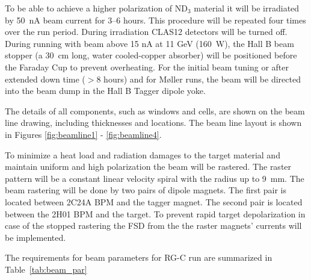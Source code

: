 \documentclass[12pt]{article}
\begin{document}
To be able to achieve a higher polarization of ND$_3$ material it will be irradiated by 50~nA beam current for 3--6 hours. This procedure will be repeated four times over the run period. During irradiation CLAS12 detectors will be turned off. During running with beam above 15 nA at 11 GeV (160~W), the Hall B beam stopper (a 30~cm long, water cooled-copper absorber) will be positioned before the Faraday Cup to prevent overheating. 
For the initial beam tuning or after extended down time ($>$8 hours) and for M\o{}ller runs, the beam will be directed into the beam dump in the Hall B Tagger dipole yoke.



The details of all components, such as windows and cells, are shown on the beam line drawing, including thicknesses and locations.  The beam line layout is shown in Figures \ref{fig:beamline1} - \ref{fig:beamline4}.


To minimize a heat load and radiation damages to the target material and maintain uniform and high polarization the beam will be rastered. The raster pattern will be a constant linear velocity  spiral with the radius up to 9~mm. The beam rastering will be done by two pairs of dipole magnets. The first pair is located between 2C24A BPM and the tagger magnet. The second pair is located between the 2H01 BPM and the target. To prevent rapid target depolarization in case of the stopped rastering the FSD from the the raster magnets' currents will be implemented.

The requirements for beam parameters for RG-C run are summarized in Table~\ref{tab:beam_par}
\end{document}
